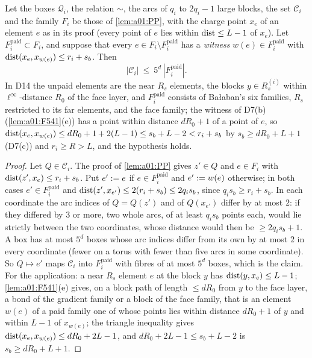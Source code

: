 \begin{lemma}\label{lem:a01:PP5}
Let the boxes $\mathcal Q_i$, the relation $\sim$, the arcs of $q_i$ to $2q_i-1$ large blocks, the set $\mathcal C_i$ and the family $F_i$ be those of \cref{lem:a01:PP}, with the charge point $x_e$ of an element $e$ as in its proof (every point of $e$ lies within $\operatorname{dist}\le L-1$ of $x_e$). Let $F_i^{\mathrm{paid}}\subset F_i$, and suppose that every $e\in F_i\setminus F_i^{\mathrm{paid}}$ has a \emph{witness} $w(e)\in F_i^{\mathrm{paid}}$ with $\operatorname{dist}(x_e,x_{w(e)})\le r_i+s_b$. Then
\[
|\mathcal C_i|\ \le\ 5^d\,|F_i^{\mathrm{paid}}|.
\]
In D14 the unpaid elements are the near $R_s$ elements, the blocks $y\in R_s^{(i)}$ within $\ell^\infty$-distance $R_0$ of the face layer, and $F_i^{\mathrm{paid}}$ consists of Ba{\l}aban's six families, $R_s$ restricted to its far elements, and the face family; the witness of D7(b) (\cref{lem:a01:F541}(e)) has a point within distance $dR_0+1$ of a point of $e$, so $\operatorname{dist}(x_e,x_{w(e)})\le dR_0+1+2(L-1)\le s_b+L-2<r_i+s_b$ by $s_b\ge dR_0+L+1$ (D7(c)) and $r_i\ge R>L$, and the hypothesis holds.
\end{lemma}
\begin{proof}
Let $Q\in\mathcal C_i$. The proof of \cref{lem:a01:PP} gives $z'\in Q$ and $e\in F_i$ with $\operatorname{dist}(z',x_e)\le r_i+s_b$. Put $e':= e$ if $e\in F_i^{\mathrm{paid}}$ and $e':= w(e)$ otherwise; in both cases $e'\in F_i^{\mathrm{paid}}$ and $\operatorname{dist}(z',x_{e'})\le2(r_i+s_b)\le2q_is_b$, since $q_is_b\ge r_i+s_b$. In each coordinate the arc indices of $Q=Q(z')$ and of $Q(x_{e'})$ differ by at most $2$: if they differed by $3$ or more, two whole arcs, of at least $q_is_b$ points each, would lie strictly between the two coordinates, whose distance would then be $\ge2q_is_b+1$. A box has at most $5^d$ boxes whose arc indices differ from its own by at most $2$ in every coordinate (fewer on a torus with fewer than five arcs in some coordinate). So $Q\mapsto e'$ maps $\mathcal C_i$ into $F_i^{\mathrm{paid}}$ with fibres of at most $5^d$ boxes, which is the claim. For the application: a near $R_s$ element $e$ at the block $y$ has $\operatorname{dist}(y,x_e)\le L-1$; \cref{lem:a01:F541}(e) gives, on a block path of length $\le dR_0$ from $y$ to the face layer, a bond of the gradient family or a block of the face family, that is an element $w(e)$ of a paid family one of whose points lies within distance $dR_0+1$ of $y$ and within $L-1$ of $x_{w(e)}$; the triangle inequality gives $\operatorname{dist}(x_e,x_{w(e)})\le dR_0+2L-1$, and $dR_0+2L-1\le s_b+L-2$ is $s_b\ge dR_0+L+1$.
\end{proof}
